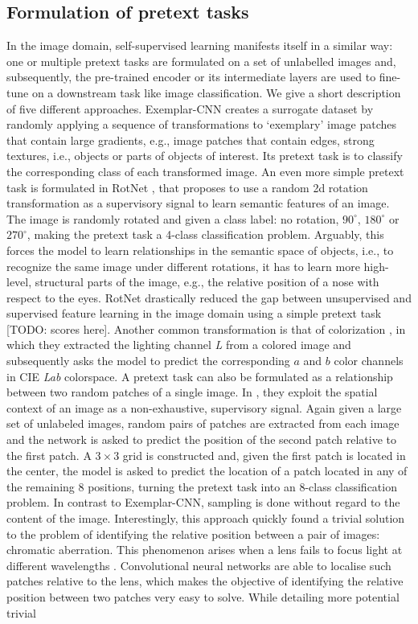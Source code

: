 \subsection{Formulation of pretext tasks}
In the image domain, self-supervised learning manifests itself in a similar way: one or multiple pretext tasks are formulated on a set of unlabelled images and, subsequently, the pre-trained encoder or its intermediate layers are used to fine-tune on a downstream task like image classification. We give a short description of five different approaches. Exemplar-CNN \cite{dosovitskiy_discriminative_2014} creates a surrogate dataset by randomly applying a sequence of transformations to `exemplary' image patches that contain large gradients, e.g., image patches that contain edges, strong textures, i.e., objects or parts of objects of interest. Its pretext task is to classify the corresponding class of each transformed image. An even more simple pretext task is formulated in RotNet \cite{gidaris2018unsupervised}, that proposes to use a random 2d rotation transformation as a supervisory signal to learn semantic features of an image. The image is randomly rotated and given a class label: no rotation, $90^\circ$, $180^\circ$ or $270^\circ$, making the pretext task a 4-class classification problem. Arguably, this forces the model to learn relationships in the semantic space of objects, i.e., to recognize the same image under different rotations, it has to learn more high-level, structural parts of the image, e.g., the relative position of a nose with respect to the eyes. RotNet drastically reduced the gap between unsupervised and supervised feature learning in the image domain using a simple pretext task [TODO: scores here]. Another common transformation is that of colorization \cite{zhang_colorful_2016}, in which they extracted the lighting channel \textit{L} from a colored image and subsequently asks the model to predict the corresponding $a$ and $b$ color channels in CIE \textit{Lab} colorspace. A pretext task can also be formulated as a relationship between two random patches of a single image. In \cite{doersch2015unsupervised}, they exploit the spatial context of an image as a non-exhaustive, supervisory signal. Again given a large set of unlabeled images, random pairs of patches are extracted from each image and the network is asked to predict the position of the second patch relative to the first patch. A $3\times 3$ grid is constructed and, given the first patch is located in the center, the model is asked to predict the location of a patch located in any of the remaining 8 positions, turning the pretext task into an 8-class classification problem. In contrast to Exemplar-CNN, sampling is done without regard to the content of the image. Interestingly, this approach quickly found a trivial solution to the problem of identifying the relative position between a pair of images: chromatic aberration. This phenomenon arises when a lens fails to focus light at different wavelengths \cite{brewster_treatise_1835}. Convolutional neural networks are able to localise such patches relative to the lens, which makes the objective of identifying the relative position between two patches very easy to solve. While detailing more potential trivial 